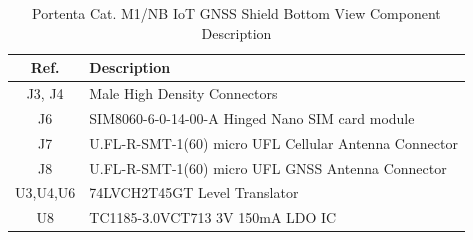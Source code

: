 \begin{table}[ht]
	\centering
	\begin{tabular}{|c|l|}
		\hline
		\textbf{Ref.} & \textbf{Description} \\
		\hline
		J3, J4 & Male High Density Connectors \\
		\hline
		J6 & SIM8060-6-0-14-00-A Hinged Nano SIM card module \\
		\hline
		J7 & U.FL-R-SMT-1(60) micro UFL Cellular Antenna Connector \\
		\hline
		J8 & U.FL-R-SMT-1(60) micro UFL GNSS Antenna Connector \\
		\hline
		U3,U4,U6 & 74LVCH2T45GT Level Translator \\
		\hline
		U8 & TC1185-3.0VCT713 3V 150mA LDO IC \\
		\hline
	\end{tabular}
	\caption{Portenta Cat. M1/NB IoT GNSS Shield Bottom View Component Description}
	\label{tab:TableBottomView}
\end{table}


